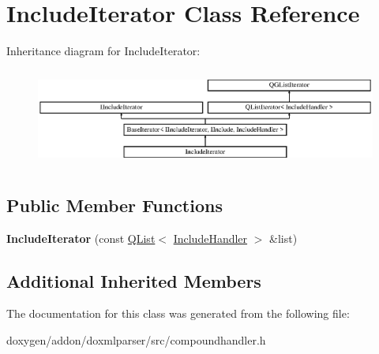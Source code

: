 \hypertarget{class_include_iterator}{}\section{Include\+Iterator Class Reference}
\label{class_include_iterator}
Inheritance diagram for Include\+Iterator\+:\begin{figure}[H]
\begin{center}
\leavevmode
\includegraphics[height=3.255814cm]{class_include_iterator}
\end{center}
\end{figure}
\subsection*{Public Member Functions}
\begin{DoxyCompactItemize}
\item 
\mbox{\label{class_include_iterator_a51f0513d838f65df8d11f43b02131466}} 
{\bfseries Include\+Iterator} (const \mbox{\hyperlink{class_q_list}{Q\+List}}$<$ \mbox{\hyperlink{class_include_handler}{Include\+Handler}} $>$ \&list)
\end{DoxyCompactItemize}
\subsection*{Additional Inherited Members}


The documentation for this class was generated from the following file\+:\begin{DoxyCompactItemize}
\item 
doxygen/addon/doxmlparser/src/compoundhandler.\+h\end{DoxyCompactItemize}
